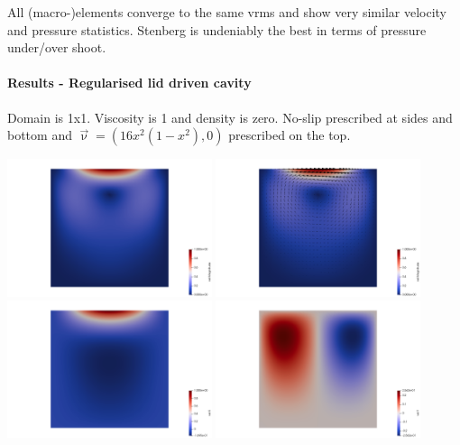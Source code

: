 All (macro-)elements converge to the same vrms and show very similar velocity and pressure statistics.
Stenberg is undeniably the best in terms of pressure under/over shoot. 



\newpage
\paragraph{Results - Regularised lid driven cavity}

Domain is 1x1. Viscosity is 1 and density is zero. 
No-slip prescribed at sides and bottom and $\vec{\upnu}=(16x^2(1-x^2),0)$ prescribed on the top.


\begin{center}
\includegraphics[width=6cm]{python_codes/fieldstone_78/results/ldc/32x32/vel}
\includegraphics[width=6cm]{python_codes/fieldstone_78/results/ldc/32x32/vel2}\\
\includegraphics[width=6cm]{python_codes/fieldstone_78/results/ldc/32x32/u}
\includegraphics[width=6cm]{python_codes/fieldstone_78/results/ldc/32x32/v}\\

\end{center}

